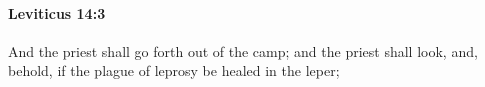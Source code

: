 
		\paragraph{Leviticus 14:3} %
			\label{LEVITICUS-14-3}

			And the priest shall go forth out of the camp; and the priest shall look, and, behold, if the plague of leprosy be healed in the leper;


